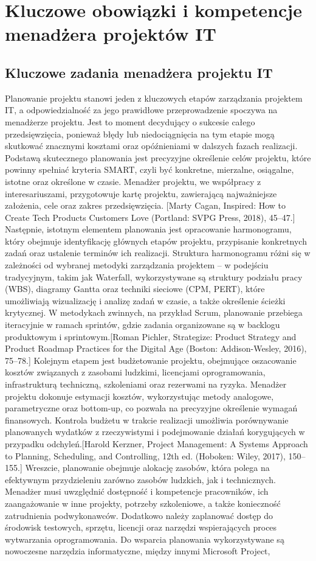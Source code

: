 \section{Kluczowe obowiązki i kompetencje menadżera projektów IT}
\subsection{Kluczowe zadania menadżera projektu IT}
Planowanie projektu stanowi jeden z kluczowych etapów zarządzania projektem IT, a odpowiedzialność za jego prawidłowe przeprowadzenie spoczywa na menadżerze projektu. Jest to moment decydujący o sukcesie całego przedsięwzięcia, ponieważ błędy lub niedociągnięcia na tym etapie mogą skutkować znacznymi kosztami oraz opóźnieniami w dalszych fazach realizacji. Podstawą skutecznego planowania jest precyzyjne określenie celów projektu, które powinny spełniać kryteria SMART, czyli być konkretne, mierzalne, osiągalne, istotne oraz określone w czasie. Menadżer projektu, we współpracy z interesariuszami, przygotowuje kartę projektu, zawierającą najważniejsze założenia, cele oraz zakres przedsięwzięcia. [Marty Cagan, Inspired: How to Create Tech Products Customers Love (Portland: SVPG Press, 2018), 45–47.] Następnie, istotnym elementem planowania jest opracowanie harmonogramu, który obejmuje identyfikację głównych etapów projektu, przypisanie konkretnych zadań oraz ustalenie terminów ich realizacji. Struktura harmonogramu różni się w zależności od wybranej metodyki zarządzania projektem – w podejściu tradycyjnym, takim jak Waterfall, wykorzystywane są struktury podziału pracy (WBS), diagramy Gantta oraz techniki sieciowe (CPM, PERT), które umożliwiają wizualizację i analizę zadań w czasie, a także określenie ścieżki krytycznej. W metodykach zwinnych, na przykład Scrum, planowanie przebiega iteracyjnie w ramach sprintów, gdzie zadania organizowane są w backlogu produktowym i sprintowym.[Roman Pichler, Strategize: Product Strategy and Product Roadmap Practices for the Digital Age (Boston: Addison-Wesley, 2016), 75–78.] Kolejnym etapem jest budżetowanie projektu, obejmujące oszacowanie kosztów związanych z zasobami ludzkimi, licencjami oprogramowania, infrastrukturą techniczną, szkoleniami oraz rezerwami na ryzyka. Menadżer projektu dokonuje estymacji kosztów, wykorzystując metody analogowe, parametryczne oraz bottom-up, co pozwala na precyzyjne określenie wymagań finansowych. Kontrola budżetu w trakcie realizacji umożliwia porównywanie planowanych wydatków z rzeczywistymi i podejmowanie działań korygujących w przypadku odchyleń.[Harold Kerzner, Project Management: A Systems Approach to Planning, Scheduling, and Controlling, 12th ed. (Hoboken: Wiley, 2017), 150–155.] Wreszcie, planowanie obejmuje alokację zasobów, która polega na efektywnym przydzieleniu zarówno zasobów ludzkich, jak i technicznych. Menadżer musi uwzględnić dostępność i kompetencje pracowników, ich zaangażowanie w inne projekty, potrzeby szkoleniowe, a także konieczność zatrudnienia podwykonawców. Dodatkowo należy zaplanować dostęp do środowisk testowych, sprzętu, licencji oraz narzędzi wspierających proces wytwarzania oprogramowania. Do wsparcia planowania wykorzystywane są nowoczesne narzędzia informatyczne, między innymi Microsoft Project, 